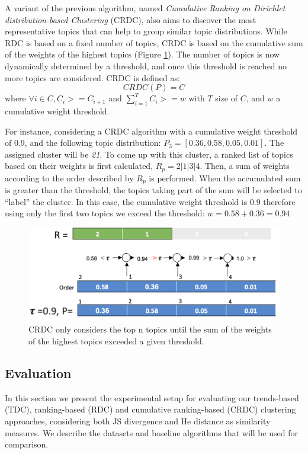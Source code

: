 A variant of the previous algorithm, named \textit{Cumulative Ranking on Dirichlet distribution-based Clustering} (CRDC), also aims to discover the most representative topics that can help to group similar topic distributions. While RDC is based on a fixed number of topics, CRDC is based on the cumulative sum of the weights of the highest topics (Figure \ref{fig:crdc-cluster}). The number of topics is now dynamically determined by a threshold, and once this threshold is reached no more topics are considered. CRDC is defined as:
\begin{equation}
CRDC(P)=C
\end{equation}
where  $\forall i \in C, C_i >=C_{i+1}$ and $\sum\limits_{i=1}^T C_i >= w$ with $T$ size of $C$, and $w$ a cumulative weight threshold.


For instance, considering a CRDC algorithm with a cumulative weight threshold of 0.9, and the following topic distribution: $P_3=[0.36, 0.58, 0.05, 0.01]$. The assigned cluster will be \textit{21}. To come up with this cluster, a ranked list of topics based on their weights is first calculated, $R_p=2|1|3|4$. Then, a sum of weights according to the order described by $R_p$ is performed. When the accumulated sum is greater than the threshold, the topics taking part of the sum will be selected to ``label'' the cluster. In this case, the cumulative weight threshold is 0.9 therefore using only the first two topics we exceed the threshold: $w=0.58+0.36=0.94$

\begin{figure}[!htbp]
  \centering
  \includegraphics[scale=0.33]{crdc-cluster.png}
  \caption{CRDC only considers the top n topics until the sum of the weights of the highest topics exceeded a given threshold.}
  \label{fig:crdc-cluster}
\end{figure}


\subsection{Evaluation}
\label{sec:clustering-experiments}
In this section we present the experimental setup for evaluating our trends-based (TDC), ranking-based (RDC) and cumulative ranking-based (CRDC) clustering approaches, considering both JS divergence and He distance as similarity measures. We describe the datasets and baseline algorithms that will be used for comparison.


